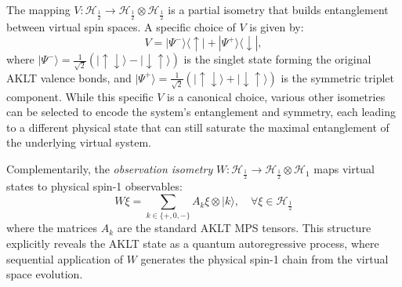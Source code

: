 \documentclass[12pt,a4paper]{article}
\begin{document}
The mapping $V: \mathcal{H}_{\frac{1}{2}} \to \mathcal{H}_{\frac{1}{2}} \otimes \mathcal{H}_{\frac{1}{2}}$ is a partial isometry that builds entanglement between virtual spin spaces. A specific choice of $V$ is given by:
\begin{equation}\label{eq:V}
  V = |\Psi^-\rangle \langle \uparrow | + |\Psi^+\rangle \langle \downarrow |,
\end{equation}
where \(|\Psi^-\rangle = \frac{1}{\sqrt{2}}(|\uparrow\downarrow\rangle - |\downarrow\uparrow\rangle)\) is the singlet state forming the original AKLT valence bonds, and \(|\Psi^+\rangle = \frac{1}{\sqrt{2}}(|\uparrow\downarrow\rangle + |\downarrow\uparrow\rangle)\) is the symmetric triplet component. While this specific $V$ is a canonical choice, various other isometries can be selected to encode the system's entanglement and symmetry, each leading to a different physical state that can still saturate the maximal entanglement of the underlying virtual system.

Complementarily, the \emph{observation isometry} $W: \mathcal{H}_{\frac{1}{2}} \to \mathcal{H}_{\frac{1}{2}} \otimes \mathcal{H}_{1}$ maps virtual states to physical spin-1 observables:
\begin{equation}\label{eq:W}
  W\xi = \sum_{k \in \{+,0,-\}} A_{k}\xi \otimes |k\rangle,\quad \forall \xi \in \mathcal{H}_{\frac{1}{2}}
\end{equation}
where the matrices \(A_{k}\) are the standard AKLT MPS tensors. This structure explicitly reveals the AKLT state as a quantum autoregressive process, where sequential application of $W$ generates the physical spin-1 chain from the virtual space evolution.
\end{document}

